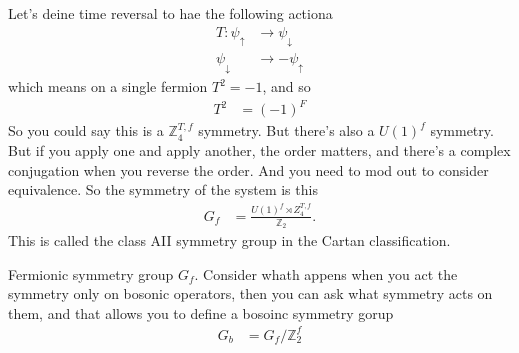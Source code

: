 Let's deine time reversal to hae the following actiona
\begin{align}
    T: \psi_\uparrow &\to \psi_\downarrow\\
    \psi_\downarrow &\to -\psi_\uparrow
\end{align}
which means on a single fermion $T^2=-1$,
and so
\begin{align}
    T^2 &= {(-1)}^F
\end{align}
So you could say this is a $\mathbb{Z}_4^{T,f}$ symmetry.
But there's also a $U(1)^f$ symmetry.
But if you apply one and apply another,
the order matters,
and there's a complex conjugation when you reverse the order.
And you need to mod out to consider equivalence.
So the symmetry of the system is this
\begin{align}
    G_f &=
    \frac{U(1)^f \rtimes Z_4^{T,f}}{\mathbb{Z}_2}.
\end{align}
This is called the class AII symmetry group in the Cartan classification.

Fermionic symmetry group $G_f$.
Consider whath appens when you act the symmetry only on bosonic operators,
then you can ask what symmetry acts on them,
and that allows you to define a bosoinc symmetry gorup
\begin{align}
    G_b &= G_f/\mathbb{Z}_2^f
\end{align}

